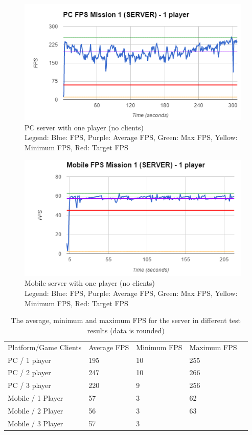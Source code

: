\begin{figure}
    \includegraphics{figures/test/PCServerOnePlayer}
    \caption{PC server with one player (no clients) \\ Legend: Blue: FPS, Purple: Average FPS, Green: Max FPS, Yellow: Minimum FPS, Red: Target FPS}
    \label{test:performance:pcserverone}
\end{figure}

\begin{figure}
    \includegraphics{figures/test/MobileServerOnePlayer}
    \caption{Mobile server with one player (no clients) \\ Legend: Blue: FPS, Purple: Average FPS, Green: Max FPS, Yellow: Minimum FPS, Red: Target FPS}
    \label{test:performance:mobileserverone}
\end{figure}

\begin{table}[h]
\begin{tabular}{lllll}\label{test:table:data}
Platform/Game Clients & Average FPS & Minimum FPS & Maximum FPS &  \\
PC / 1 player         & 195         & 10          & 255         &  \\
PC / 2 player         & 247         & 10          & 266         &  \\
PC / 3 player         & 220         & 9           & 256         &  \\
Mobile / 1 Player     & 57          & 3           & 62          &  \\
Mobile / 2 Player     & 56          & 3           & 63          &  \\
Mobile / 3 Player     & 57          & 3           &             & 
\end{tabular}
\caption{The average, minimum and maximum FPS for the server in different test results (data is rounded) }
\end{table}

